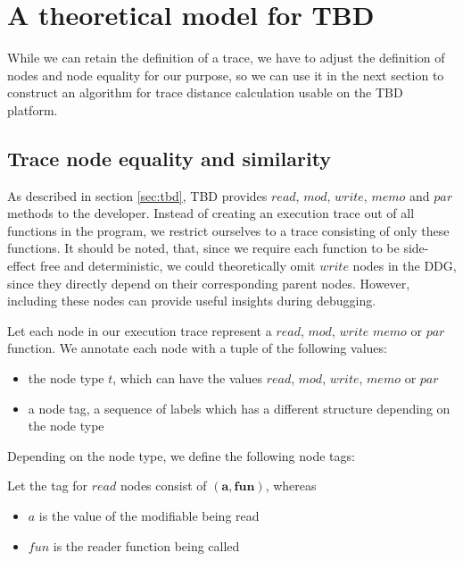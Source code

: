 \section{A theoretical model for TBD}
While we can retain the definition of a trace, we have to adjust the definition of nodes and node equality for our purpose, so we can use it in the next section to construct an algorithm for trace distance calculation usable on the TBD platform. 

\subsection{Trace node equality and similarity}
\label{sec:node_equality}
As described in section \ref{sec:tbd}, TBD provides $read$, $mod$, $write$, $memo$ and $par$ methods to the developer. Instead of creating an execution trace out of all  functions in the program, we restrict ourselves to a trace consisting of only these functions. It should be noted, that, since we require each function to be side-effect free and deterministic, we could theoretically omit $write$ nodes in the DDG, since they directly depend on their corresponding parent nodes. However, including these nodes can provide useful insights during debugging. 

\begin{definition}
Let each node in our execution trace represent a $read$, $mod$, $write$ $memo$ or $par$ function. We annotate each node with a tuple of the following values:
\begin{itemize}
\item the node type $t$, which can have the values $read$, $mod$, $write$, $memo$ or $par$
\item a node tag, a sequence of labels which has a different structure depending on the node type 
\end{itemize}
\end{definition}

Depending on the node type, we define the following node tags: 

\begin{definition}
Let the tag for $read$ nodes consist of $\mathbf{(a, fun)}$, whereas
\begin{itemize}
\item $a$ is the value of the modifiable being read
\item $fun$ is the reader function being called
\end{itemize}
\end{definition}

